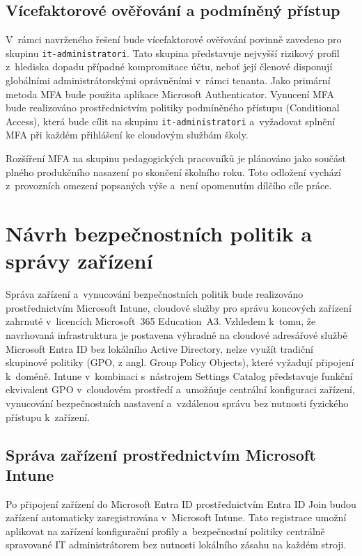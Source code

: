 \documentclass[male,czech,api_bc]{kitheses}
\begin{document}
\subsection{Vícefaktorové ověřování a podmíněný přístup}

V~rámci navrženého řešení bude vícefaktorové ověřování povinně zavedeno pro 
skupinu \texttt{it-\allowbreak administratori}. Tato skupina představuje nejvyšší rizikový 
profil z~hlediska dopadu případné kompromitace účtu, neboť její členové 
disponují globálními administrátorskými oprávněními v~rámci tenanta. 
Jako primární metoda MFA bude použita aplikace Microsoft Authenticator. 
Vynucení MFA bude realizováno prostřednictvím politiky podmíněného přístupu 
(Conditional Access), která bude cílit na skupinu \texttt{it-\allowbreak administratori}
a~vyžadovat splnění MFA při každém přihlášení ke cloudovým službám školy.

Rozšíření MFA na skupinu pedagogických pracovníků je plánováno jako součást plného produkčního nasazení po skončení školního roku. Toto odložení vychází z~provozních omezení popsaných výše a~není opomenutím dílčího cíle práce.

\section{Návrh bezpečnostních politik a správy zařízení}

Správa zařízení a~vynucování bezpečnostních politik bude realizováno 
prostřednictvím Microsoft Intune, cloudové služby pro správu koncových 
zařízení zahrnuté v~licencích Microsoft~365 Education~A3. Vzhledem k~tomu, 
že navrhovaná infrastruktura je postavena výhradně na cloudové adresářové 
službě Microsoft Entra ID bez lokálního Active Directory, nelze využít 
tradiční skupinové politiky (GPO, z angl. Group Policy Objects), které vyžadují připojení k~doméně. 
Intune v~kombinaci s~nástrojem Settings Catalog představuje funkční 
ekvivalent GPO v~cloudovém prostředí a~umožňuje centrální konfiguraci 
zařízení, vynucování bezpečnostních nastavení a~vzdálenou správu 
bez nutnosti fyzického přístupu k~zařízení.

\subsection{Správa zařízení prostřednictvím Microsoft Intune}

Po připojení zařízení do Microsoft Entra ID prostřednictvím Entra ID Join 
budou zařízení automaticky zaregistrována v~Microsoft Intune. Tato 
registrace umožní aplikovat na zařízení konfigurační profily a~bezpečnostní 
politiky centrálně spravované IT administrátorem bez nutnosti lokálního 
zásahu na každém stroji.
\end{document}
